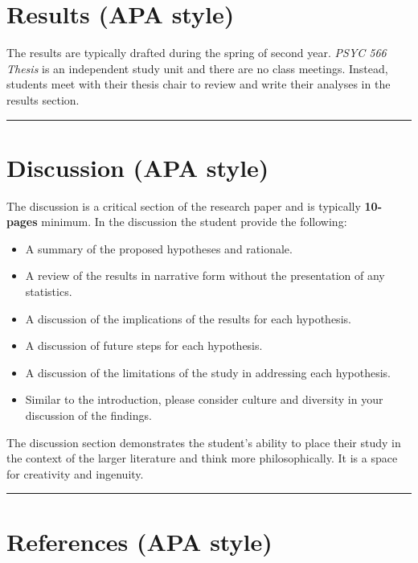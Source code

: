 \documentclass[openany]{book}
\providecommand{\tightlist}{%
  \setlength{\itemsep}{0pt}\setlength{\parskip}{0pt}}
\begin{document}
\hypertarget{results-apa-style}{%
\section{Results (APA style)}\label{results-apa-style}}

The results are typically drafted during the spring of second year. \emph{PSYC 566 Thesis} is an independent study unit and there are no class meetings. Instead, students meet with their thesis chair to review and write their analyses in the results section.

\begin{center}\rule{0.5\linewidth}{0.5pt}\end{center}

\hypertarget{discussion-apa-style}{%
\section{Discussion (APA style)}\label{discussion-apa-style}}

The discussion is a critical section of the research paper and is typically \textbf{10-pages} minimum. In the discussion the student provide the following:

\begin{itemize}
\tightlist
\item
  A summary of the proposed hypotheses and rationale.
\item
  A review of the results in narrative form without the presentation of any statistics.
\item
  A discussion of the implications of the results for each hypothesis.
\item
  A discussion of future steps for each hypothesis.
\item
  A discussion of the limitations of the study in addressing each hypothesis.
\item
  Similar to the introduction, please consider culture and diversity in your discussion of the findings.
\end{itemize}

The discussion section demonstrates the student's ability to place their study in the context of the larger literature and think more philosophically. It is a space for creativity and ingenuity.

\begin{center}\rule{0.5\linewidth}{0.5pt}\end{center}

\hypertarget{references-apa-style}{%
\section{References (APA style)}\label{references-apa-style}}
\end{document}

